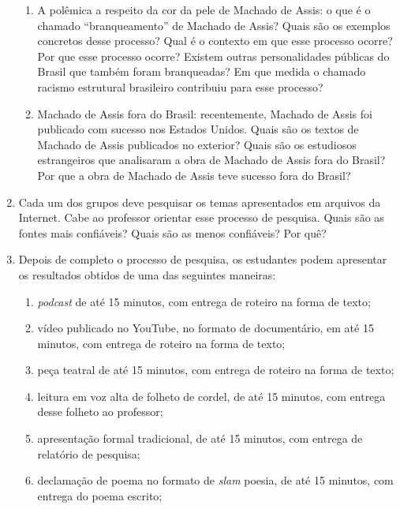 \documentclass{extarticle}
\begin{document}
\begin{enumerate}
\begin{enumerate}
\item A polêmica a respeito da cor da pele de Machado de Assis: o que é o
chamado ``branqueamento'' de Machado de Assis? Quais são os exemplos
concretos desse processo? Qual é o contexto em que esse processo ocorre?
Por que esse processo ocorre? Existem outras personalidades públicas do
Brasil que também foram branqueadas? Em que medida o chamado racismo
estrutural brasileiro contribuiu para esse processo?

\item Machado de Assis fora do Brasil: recentemente, Machado de Assis foi
publicado com sucesso nos Estados Unidos. Quais são os textos de Machado
de Assis publicados no exterior? Quais são os estudiosos estrangeiros
que analisaram a obra de Machado de Assis fora do Brasil? Por que a obra
de Machado de Assis teve sucesso fora do Brasil?
\end{enumerate}

\item Cada um dos grupos deve pesquisar os temas apresentados em arquivos
da Internet. Cabe ao professor orientar esse processo de pesquisa. Quais
são as fontes mais confiáveis? Quais são as menos confiáveis? Por quê?

\item Depois de completo o processo de pesquisa, os estudantes podem
apresentar os resultados obtidos de uma das seguintes maneiras:

\begin{enumerate}
\item \emph{podcast} de até 15 minutos, com entrega de roteiro na forma de texto;

\item vídeo publicado no YouTube, no formato de documentário, em até 15
minutos, com entrega de roteiro na forma de texto;

\item peça teatral de até 15 minutos, com entrega de roteiro na forma de
texto;

\item leitura em voz alta de folheto de cordel, de até 15 minutos, com
entrega desse folheto ao professor;

\item apresentação formal tradicional, de até 15 minutos, com entrega de
relatório de pesquisa;

\item declamação de poema no formato de \emph{slam} poesia, de até 15 minutos, com
entrega do poema escrito;


\end{enumerate}
\end{enumerate}
\end{document}
